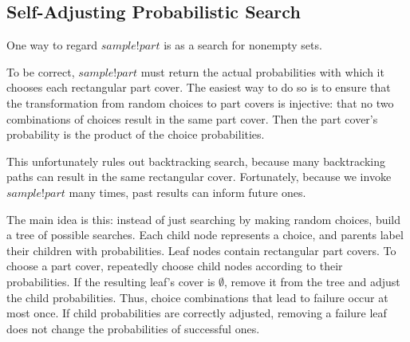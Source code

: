 \subsection{Self-Adjusting Probabilistic Search}
\label{sec:self-adjusting}

One way to regard $sample!part$ is as a search for nonempty sets.

To be correct, $sample!part$ must return the actual probabilities with which it chooses each rectangular part cover.
The easiest way to do so is to ensure that the transformation from random choices to part covers is injective: that no two combinations of choices result in the same part cover.
Then the part cover's probability is the product of the choice probabilities.

This unfortunately rules out backtracking search, because many backtracking paths can result in the same rectangular cover.
Fortunately, because we invoke $sample!part$ many times, past results can inform future ones.

The main idea is this: instead of just searching by making random choices, build a tree of possible searches.
Each child node represents a choice, and parents label their children with probabilities.
Leaf nodes contain rectangular part covers.
To choose a part cover, repeatedly choose child nodes according to their probabilities.
If the resulting leaf's cover is $\emptyset$, remove it from the tree and adjust the child probabilities.
Thus, choice combinations that lead to failure occur at most once.
If child probabilities are correctly adjusted, removing a failure leaf does not change the probabilities of successful ones.

